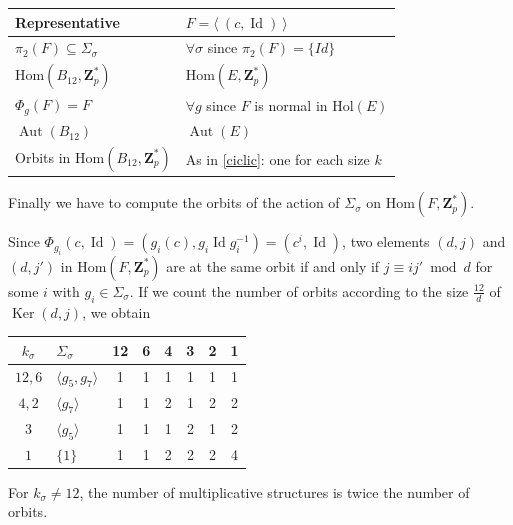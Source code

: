 \documentclass[12pt]{article}
\theoremstyle{definition}
\newcommand{\Z}{\mathbf Z}
\newcommand{\Hol}{\mathrm{Hol}}
\newcommand{\Hom}{\mathrm{Hom}}
\newcommand{\Ker}{\operatorname{Ker}}
\newcommand{\Aut}{\operatorname{Aut}}
\newcommand{\Id}{\operatorname{Id}}
\begin{document}
\begin{center}
    \begin{tabular}{|l|l|}
    \hline
      Representative& $F=\langle\  (c,\Id)\ \rangle $ \\
      \hline
      $\pi_2(F)\subseteq \Sigma_{\sigma}$ &  $\forall\sigma$ since $\pi_2(F)=\{Id\}$ \\
      $\Hom(B_{12},\Z_p^*)$ & $\Hom(E,\Z_p^*)$  \\
      $\Phi_g(F)=F$ & $\forall g$ since $F$ is normal in $\Hol(E)$\\
      $\Aut(B_{12})$ & $\Aut(E)$\\
      Orbits in $\Hom(B_{12},\Z_p^*)$ & As in \ref{ciclic}: one for each size $k$\\
      \hline
    \end{tabular}
\end{center}    


	Finally we have to compute the orbits of the action  of $\Sigma_{\sigma}$ on $\Hom(F,\Z_p^*)$.
	
	Since $\Phi_{g_i}(c,\Id)=(g_i(c),g_i \Id g_i^{-1})=(c^i,\Id)$,
	two elements $(d,j)$ and $(d,j')$ in $\Hom(F,\Z_p^*)$ are at the same orbit if and only if $j\equiv ij'\bmod d$ for some $i$ with $g_i\in \Sigma_{\sigma}$.
	If we count the number of orbits according to the size $\frac{12}d$ of $\Ker(d,j)$, we obtain
	\begin{center}
		\begin{tabular}{c|l|cccccc}
			$k_{\sigma}$ & $\Sigma_{\sigma}$   & 12 &6 &4&3&2&1  \\
			\hline
			$12,6$ & $\langle g_5,g_7\rangle$ & 1 &1 &1&1&1&1\\
			$4,2$&  $\langle g_7\rangle$& 1&1&2&1&2&2 \\
			$3$ &  $\langle g_5\rangle$& 1 & 1& 1& 2& 1&2  \\
			$1$ &  $\{1\}$& 1 &1 &2&2&2 &4\\
		\end{tabular}
	\end{center}
	For $k_{\sigma}\ne 12$, the number of multiplicative structures is twice the number of orbits.
	
\end{document}
